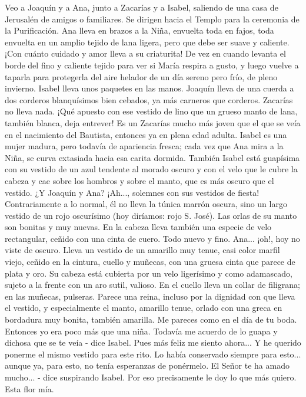 \documentclass[12pt]{book} %
\begin{document}
Veo a Joaquín y a Ana, junto a Zacarías y a Isabel, saliendo de una casa de Jerusalén de amigos o familiares. Se dirigen 
hacia el Templo para la ceremonia de la Purificación. 
Ana lleva en brazos a la Niña, envuelta toda en fajos, toda envuelta en un amplio tejido de lana ligera, pero que debe 
ser suave y caliente. ¡Con cuánto cuidado y amor lleva a su criaturita! De vez en cuando levanta el borde del fino y caliente tejido para ver si María respira a gusto, y luego vuelve a taparla para protegerla del aire helador de un día sereno pero frío, de pleno invierno. 
Isabel lleva unos paquetes en las manos. Joaquín lleva de una cuerda a dos corderos blanquísimos bien cebados, ya más carneros que corderos. Zacarías no lleva nada. ¡Qué apuesto con ese vestido de lino que un grueso manto de lana, también blanca, deja entrever! Es un Zacarías mucho más joven que el que se veía en el nacimiento del Bautista, entonces ya en plena edad adulta. Isabel es una mujer madura, pero todavía de apariencia fresca; cada vez que Ana mira a la Niña, se curva extasiada hacia esa carita dormida. También Isabel está guapísima con su vestido de un azul tendente al morado oscuro y con el velo que le cubre la cabeza y cae sobre los hombros y sobre el manto, que es más oscuro que el vestido. 
¿Y Joaquín y Ana? ¡Ah..., solemnes con sus vestidos de fiesta! Contrariamente a lo normal, él no lleva la túnica marrón 
oscura, sino un largo vestido de un rojo oscurísimo (hoy diríamos: rojo S. José). Las orlas de su manto son bonitas y muy nuevas. En la cabeza lleva también una especie de velo rectangular, ceñido con una cinta de cuero. Todo nuevo y fino. 
Ana... ¡oh!, hoy no viste de oscuro. Lleva un vestido de un amarillo muy tenue, casi color marfil viejo, ceñido en la 
cintura, cuello y muñecas, con una gruesa cinta que parece de plata y oro. Su cabeza está cubierta por un velo ligerísimo y como adamascado, sujeto a la frente con un aro sutil, valioso. En el cuello lleva un collar de filigrana; en las muñecas, pulseras. Parece una reina, incluso por la dignidad con que lleva el vestido, y especialmente el manto, amarillo tenue, orlado con una greca en bordadura muy bonita, también amarilla. 
Me pareces como en el día de tu boda. Entonces yo era poco más que una niña. Todavía me acuerdo de lo guapa y 
dichosa que se te veía - dice Isabel. 
Pues más feliz me siento ahora... Y he querido ponerme el mismo vestido para este rito. Lo había conservado siempre 
para esto... aunque ya, para esto, no tenía esperanzas de ponérmelo. 
El Señor te ha amado mucho... - dice suspirando Isabel. 
Por eso precisamente le doy lo que más quiero. Esta flor mía. 
\end{document}
